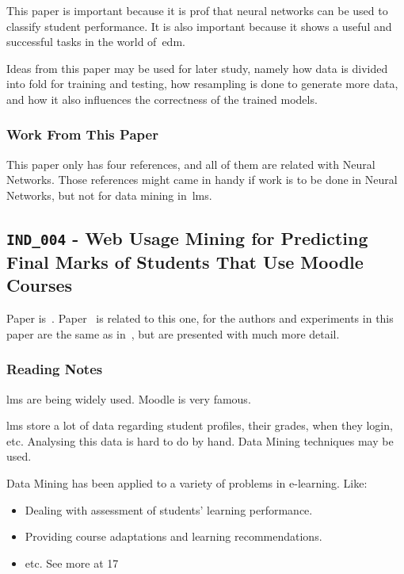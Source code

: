 This paper is important because it is prof that neural networks can be used to
classify student performance. It is also important because it shows a useful
and successful tasks in the world of~\gls{edm}.

Ideas from this paper may be used for later study, namely how data is divided
into fold for training and testing, how resampling is done to generate more
data, and how it also influences the correctness of the trained models.

\subsubsection{Work From This Paper}

This paper only has four references, and all of them are related with Neural
Networks. Those references might came in handy if work is to be done in Neural
Networks, but not for data mining in~\gls{lms}.

\subsection{\texttt{IND\_004} - Web Usage Mining for Predicting Final Marks of
Students That Use Moodle Courses}

Paper is~\cite{ind_004}. Paper~\cite{ind_001} is related to this one, for the
authors and experiments in this paper are the same as in~\cite{ind_001}, but
are presented with much more detail.

\subsubsection{Reading Notes}

\Gls{lms} are being widely used. Moodle is very famous.

\Gls{lms} store a lot of data regarding student profiles, their grades, when
they login, etc. Analysing this data is hard to do by hand. Data Mining
techniques may be used.

Data Mining has been applied to a variety of problems in e-learning. Like:

\begin{itemize}
    \item Dealing with assessment of students' learning performance.
    \item Providing course adaptations and learning recommendations.
    \item etc. See more at 17
\end{itemize}

